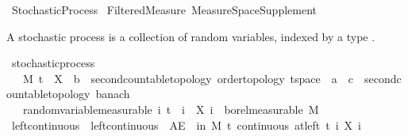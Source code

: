 %
\begin{isabellebody}%
%
%
\isadelimtheory
\isanewline
\isanewline
%
\endisadelimtheory
%
\isatagtheory
{}\isamarkupfalse%
\ Stochastic{\isacharunderscore}{\kern0pt}Process\isanewline
{}\ Filtered{\isacharunderscore}{\kern0pt}Measure\ Measure{\isacharunderscore}{\kern0pt}Space{\isacharunderscore}{\kern0pt}Supplement\isanewline
{}%
\endisatagtheory
{\isafoldtheory}%
%
\isadelimtheory
%
\endisadelimtheory
%
\isadelimdocument
%
\endisadelimdocument
%
\isatagdocument
%
\isamarkuptrue%
%
\isamarkuptrue%
%
\endisatagdocument
{\isafolddocument}%
%
\isadelimdocument
%
\endisadelimdocument
%
\begin{isamarkuptext}%
A stochastic process is a collection of random variables, indexed by a type .%
\end{isamarkuptext}\isamarkuptrue%
\isamarkupfalse%
\ stochastic{\isacharunderscore}{\kern0pt}process\ {\isacharequal}{\kern0pt}\isanewline
\ \ \ M\ t\ \ X\ {\isacharcolon}{\kern0pt}{\isacharcolon}{\kern0pt}\ {\isachardoublequoteopen}{\isacharprime}{\kern0pt}b\ {\isacharcolon}{\kern0pt}{\isacharcolon}{\kern0pt}\ {\isacharbraceleft}{\kern0pt}second{\isacharunderscore}{\kern0pt}countable{\isacharunderscore}{\kern0pt}topology{\isacharcomma}{\kern0pt}\ order{\isacharunderscore}{\kern0pt}topology{\isacharcomma}{\kern0pt}\ t{}{\isacharunderscore}{\kern0pt}space{\isacharbraceright}{\kern0pt}\ {\isasymRightarrow}\ {\isacharprime}{\kern0pt}a\ {\isasymRightarrow}\ {\isacharprime}{\kern0pt}c\ {\isacharcolon}{\kern0pt}{\isacharcolon}{\kern0pt}\ {\isacharbraceleft}{\kern0pt}second{\isacharunderscore}{\kern0pt}countable{\isacharunderscore}{\kern0pt}topology{\isacharcomma}{\kern0pt}\ banach{\isacharbraceright}{\kern0pt}{\isachardoublequoteclose}\isanewline
\ \ \ random{\isacharunderscore}{\kern0pt}variable{\isacharbrackleft}{\kern0pt}measurable{\isacharbrackright}{\kern0pt}{\isacharcolon}{\kern0pt}\ {\isachardoublequoteopen}{\isasymAnd}i{\isachardot}{\kern0pt}\ t\ {\isasymle}\ i\ {\isasymLongrightarrow}\ X\ i\ {\isasymin}\ borel{\isacharunderscore}{\kern0pt}measurable\ M{\isachardoublequoteclose}\isanewline
{}\isanewline
\isanewline
{}\isamarkupfalse%
\ left{\isacharunderscore}{\kern0pt}continuous\ \ {\isachardoublequoteopen}left{\isacharunderscore}{\kern0pt}continuous\ {\isacharequal}{\kern0pt}\ {\isacharparenleft}{\kern0pt}AE\ {\isasymxi}\ in\ M{\isachardot}{\kern0pt}\ {\isasymforall}t{\isachardot}{\kern0pt}\ continuous\ {\isacharparenleft}{\kern0pt}at{\isacharunderscore}{\kern0pt}left\ t{\isacharparenright}{\kern0pt}\ {\isacharparenleft}{\kern0pt}{\isasymlambda}i{\isachardot}{\kern0pt}\ X\ i\ {\isasymxi}{\isacharparenright}{\kern0pt}{\isacharparenright}{\kern0pt}{\isachardoublequoteclose}\isanewline

\end{isabellebody}
